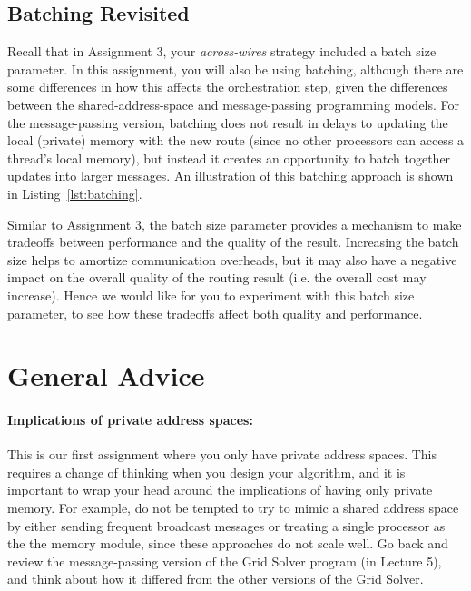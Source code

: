 \documentclass[11pt]{article}
\begin{document}
\subsection*{Batching Revisited}

Recall that in Assignment 3, your \textit{across-wires} strategy included a batch size parameter. In this assignment, you will also be using batching, although there are some differences in how this affects the orchestration step, given the differences between the shared-address-space and message-passing programming models. For the message-passing version, batching does not result in delays to updating the local (private) memory with the new route (since no other processors can access a thread's local memory), but instead it creates an opportunity to batch together updates into larger messages. An illustration of this batching approach is shown in Listing~\ref{lst:batching}.

Similar to Assignment 3, the batch size parameter provides a mechanism to make tradeoffs between performance and the quality of the result. Increasing the batch size helps to amortize communication overheads, but it may also have a negative impact on the overall quality of the routing result (i.e. the overall cost may increase). Hence we would like for you to experiment with this batch size parameter, to see how these tradeoffs affect both quality and performance.

\section*{General Advice}

\paragraph{Implications of private address spaces:}
This is our first assignment where you only have private address spaces. This requires a change of thinking when you design your algorithm, and it is important to wrap your head around the implications of having only private memory. For example, do not be tempted to try to mimic a shared address space by either sending frequent broadcast messages or treating a single processor as the the memory module, since these approaches do not scale well. Go back and review the message-passing version of the Grid Solver program (in Lecture 5), and think about how it differed from the other versions of the Grid Solver.
\end{document}

